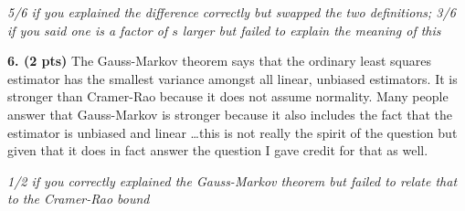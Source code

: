 \documentclass[12pt]{article}
\begin{document}
{\it 5/6 if you explained the difference correctly but swapped the two
definitions; 3/6 if you said one is a factor of $s$ larger but failed to explain
the meaning of this}

{\bf 6. (2 pts)} The Gauss-Markov theorem says that the ordinary least squares estimator
has the smallest variance amongst all linear, unbiased estimators. It is stronger
than Cramer-Rao because it does not assume normality. Many people answer that
Gauss-Markov is stronger because it also includes the fact that the estimator
is unbiased and linear \ldots this is not really the spirit of the question but
given that it does in fact answer the question I gave credit for that as well.

{\it 1/2 if you correctly explained the Gauss-Markov theorem but failed to relate
that to the Cramer-Rao bound}
\end{document}
